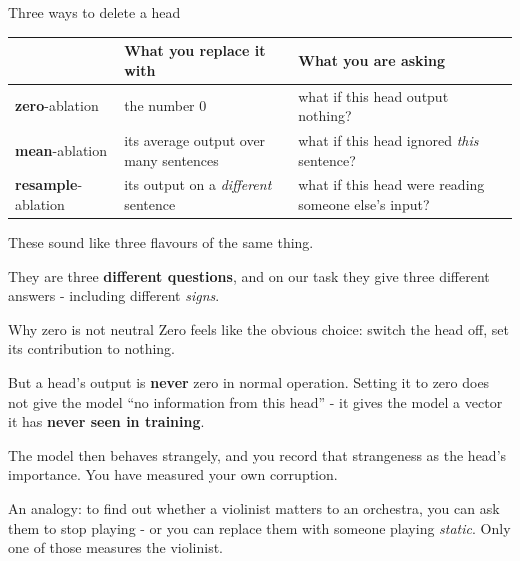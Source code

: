 \documentclass[aspectratio=169]{beamer}
\newcommand{\keybox}[1]{%
  \begin{tcolorbox}[colback=armblue!8, colframe=armblue, boxrule=0.6pt, arc=2pt]
  #1
  \end{tcolorbox}}
\newcommand{\trapbox}[1]{%
  \begin{tcolorbox}[colback=armred!8, colframe=armred, boxrule=0.6pt, arc=2pt]
  #1
  \end{tcolorbox}}
\begin{document}
\begin{frame}{Three ways to delete a head}
  \vspace{0.5em}
  \begin{center}
  \small
  \begin{tabular}{@{}p{}p{}p{}@{}}
    \toprule
    & \textbf{What you replace it with} & \textbf{What you are asking}\\
    \midrule
    \textbf{zero}-ablation & the number 0 & what if this head output nothing?\\[0.5em]
    \textbf{mean}-ablation & its average output over many sentences & what if this head ignored
      \emph{this} sentence?\\[0.5em]
    \textbf{resample}-ablation & its output on a \emph{different} sentence & what if this head
      were reading someone else's input?\\
    \bottomrule
  \end{tabular}
  \end{center}

  \vspace{0.9em}
  These sound like three flavours of the same thing.

  \vspace{0.5em}
  \keybox{They are three \textbf{different questions}, and on our task they give three different
  answers - including different \emph{signs}.}
\end{frame}

\begin{frame}{Why zero is not neutral}
  \vspace{0.7em}
  Zero feels like the obvious choice: switch the head off, set its contribution to nothing.

  \vspace{0.9em}
  \trapbox{But a head's output is \textbf{never} zero in normal operation. Setting it to zero
  does not give the model ``no information from this head'' - it gives the model a vector it has
  \textbf{never seen in training}.}

  \vspace{0.9em}
  The model then behaves strangely, and you record that strangeness as the head's importance. You
  have measured your own corruption.

  \vspace{0.8em}
  \begin{center}
  {\small An analogy: to find out whether a violinist matters to an orchestra, you can ask them
  to stop playing - or you can replace them with someone playing \emph{static}. Only one of those
  measures the violinist.}
  \end{center}
\end{frame}
\end{document}
